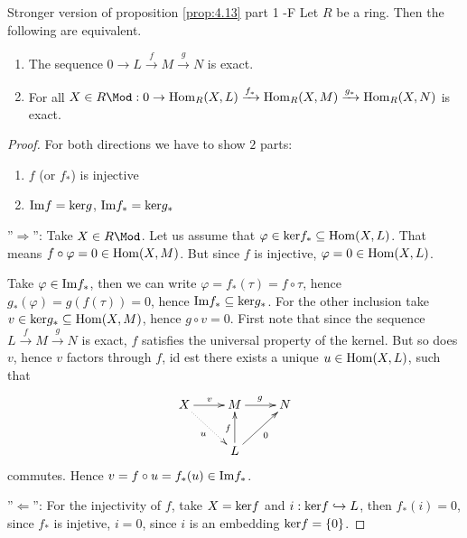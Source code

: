 \documentclass[twoside = false,	%
		headsepline,		%
		parskip = true,
		]{scrbook}						%
\begin{document}
        \begin{proposition*}{Stronger version of proposition \ref{prop:4.13} part 1 -F}
            Let $R$ be a ring. Then the following are equivalent.
            \begin{enumerate}
                \item The sequence $0 \to L \xrightarrow{f} M \xrightarrow{g} N$ is exact.
                \item For all $X \in R\Mod:
                0 \to \Hom_R(X,L) \xrightarrow{f_*} \Hom_R(X,M) \xrightarrow{g_*} \Hom_R(X,N)$ is exact.
            \end{enumerate}
        \end{proposition*}

        \begin{proof}
            For both directions we have to show $2$ parts:
        \begin{enumerate}
            \item $f$ (or $f_*$) is injective
            \item $\mathrm{Im} f =\mathrm{ker} g$, $\mathrm{Im} f_* = \mathrm{ker} g_*$
        \end{enumerate}
        ''$\Rightarrow$'': Take $X \in R\Mod$.
        Let us assume that $\varphi \in \mathrm{ker} f_* \subseteq \mathrm{Hom}(X,L)$.
        That means $f \circ \varphi = 0 \in \mathrm{Hom}(X,M)$. But since $f$ is injective, $\varphi = 0 \in \mathrm{Hom}(X,L)$.

        Take $\varphi \in \mathrm{Im} f_*$, then we can write $\varphi = f_* (\tau) = f \circ \tau$, hence
        $g_*(\varphi) = g(f(\tau)) = 0$, hence $\mathrm{Im} f_* \subseteq \mathrm{ker} g_*$.
        For the other inclusion take $v \in \mathrm{ker} g_* \subseteq \mathrm{Hom}(X,M)$, hence $g \circ v = 0$.
        First note that since the sequence $L \xrightarrow{f} M \xrightarrow{g} N$ is exact, $f$ satisfies the
        universal property of the kernel. But so does $v$, hence $v$ factors through $f$, id est there exists a unique $u \in \mathrm{Hom}(X,L)$, such that
        \begin{equation*}
            \xymatrix {
                X \ar[r]^{v} \ar@{.>}[dr]_{u} & M\ar[r]^{g} & N \\
                 & L \ar[u]^{f} \ar[ur]_{0}
            }
        \end{equation*}
        commutes. Hence $v = f \circ u = f_*(u) \in \mathrm{Im} f_*$.

        ''$\Leftarrow$'':
        For the injectivity of $f$, take $X = \mathrm{ker} f$ and $i: \mathrm{ker} f \hookrightarrow L$, then
        $f_*(i) = 0$, since $f_*$ is injetive, $i=0$, since $i$ is an embedding $\mathrm{ker} f = \{0\}$.


\end{proof}
\end{document}

